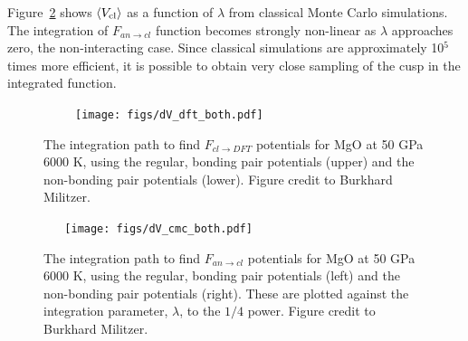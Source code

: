 Figure~\ref{fig:integrate_cmc} shows $\left< V_{\rm cl} \right>$ as a function
of $\lambda$ from classical Monte Carlo simulations. The integration of
$F_{an \to cl}$ function becomes strongly non-linear as $\lambda$
approaches zero, the non-interacting case. Since classical simulations are
approximately 10$^5$ times more efficient, it is possible to obtain very
close sampling of the cusp in the integrated function. 

\begin{figure}[h!]  
  \centering
    \texttt{[image: figs/dV\_dft\_both.pdf]}
\caption{The integration path to find $F_{cl \to DFT}$ potentials for MgO
at 50 GPa 6000 K, using the regular, bonding pair potentials (upper) and
the non-bonding pair potentials (lower). Figure credit to Burkhard Militzer. }
\label{fig:integrate_dft}
\end{figure}

\begin{figure}[h!]  
  \centering
  \texttt{[image: figs/dV\_cmc\_both.pdf]}
\caption{The integration path to find $F_{an \to cl}$ potentials for MgO at 50 GPa 6000
K, using the regular, bonding pair potentials (left) and
the non-bonding pair potentials (right). These are plotted against the
integration parameter, $\lambda$, to the $1/4$ power. Figure credit to Burkhard
Militzer. }
\label{fig:integrate_cmc}
\end{figure}


